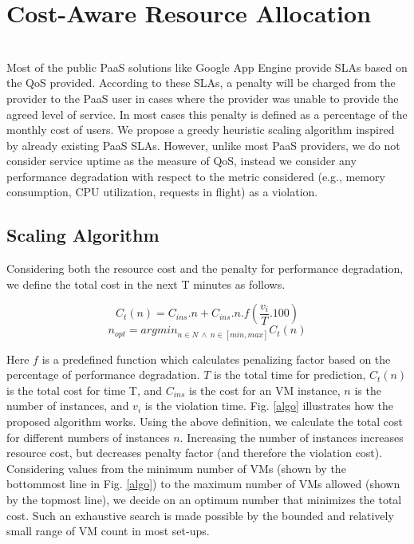 \section{Cost-Aware Resource Allocation}\\
Most of the public PaaS solutions like Google App Engine provide SLAs based on the QoS provided. According to these SLAs, a penalty will be charged from the provider to the PaaS user in cases where the provider was unable to provide the agreed level of service. In most cases this penalty is defined as a percentage of the monthly cost of users. We propose a greedy heuristic scaling algorithm inspired by already existing PaaS SLAs. However, unlike most PaaS providers, we do not consider service uptime as the measure of QoS, instead we consider any performance degradation with respect to the metric considered (e.g., memory consumption, CPU utilization, requests in flight) as a violation.\\

\subsection{Scaling Algorithm}
Considering both the resource cost and the penalty for performance degradation, we define the total cost in the next T minutes as follows.

\textbf{$$ C_t(n) = C_{ins}.n  + C_{ins} . n . f(\frac{v_i}{T}.100) $$}
\textbf{$$n_{opt} = argmin_{n \in N \ \land \ n \in [min, max]}C_t(n)$$} 

Here $f$ is a predefined function which calculates penalizing factor based on the percentage of performance degradation. $T$ is the total time for prediction, $C_t(n)$ is the total cost for time T, and $C_{ins}$ is the cost for an VM instance, $n$ is the number of instances, and $v_i$ is the violation time. Fig. \ref{algo} illustrates how the proposed algorithm works. Using the above definition, we calculate the total cost for different numbers of instances $n$. Increasing the number of instances increases resource cost, but decreases penalty factor (and therefore the violation cost). Considering values from the minimum number of VMs (shown by the bottommost line in Fig. \ref{algo}) to the maximum number of VMs allowed (shown by the topmost line), we decide on an optimum number that minimizes the total cost. Such an exhaustive search is made possible by the bounded and relatively small range of VM count in most set-ups.